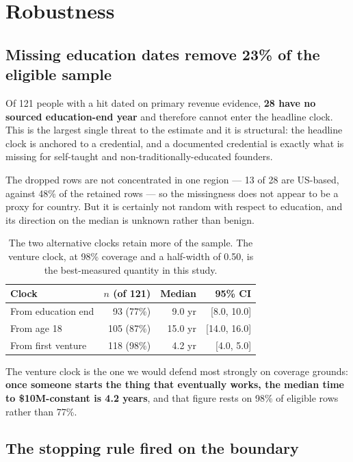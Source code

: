 \documentclass[11pt]{article}
\begin{document}
\section{Robustness}
\label{sec:robust}

\subsection{Missing education dates remove 23\% of the eligible sample}

Of 121 people with a hit dated on primary revenue evidence, \textbf{28 have no
sourced education-end year} and therefore cannot enter the headline clock. This
is the largest single threat to the estimate and it is structural: the headline
clock is anchored to a credential, and a documented credential is exactly what
is missing for self-taught and non-traditionally-educated founders.

The dropped rows are not concentrated in one region --- 13 of 28 are US-based,
against 48\% of the retained rows --- so the missingness does not appear to be a
proxy for country. But it is certainly not random with respect to education, and
its direction on the median is unknown rather than benign.

\begin{table}[h]
\centering
\begin{tabular}{lrrr}
\toprule
Clock & $n$ (of 121) & Median & 95\% CI \\
\midrule
From education end & 93 (77\%) & 9.0 yr & [8.0, 10.0] \\
From age 18 & 105 (87\%) & 15.0 yr & [14.0, 16.0] \\
From first venture & 118 (98\%) & 4.2 yr & [4.0, 5.0] \\
\bottomrule
\end{tabular}
\caption{The two alternative clocks retain more of the sample. The
venture clock, at 98\% coverage and a half-width of 0.50, is the best-measured
quantity in this study.}
\end{table}

The venture clock is the one we would defend most strongly on coverage grounds:
\textbf{once someone starts the thing that eventually works, the median time to
\$10M-constant is 4.2 years}, and that figure rests on 98\% of eligible rows
rather than 77\%.

\subsection{The stopping rule fired on the boundary}
\end{document}
